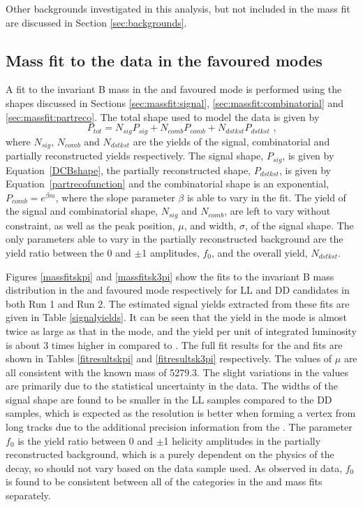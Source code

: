 Other backgrounds investigated in this analysis, but not included in the mass fit are discussed in Section \ref{sec:backgrounds}.


\subsection{Mass fit to the data in the favoured modes}
\label{sec:massfit:fit}

A fit to the invariant B mass in the \kpi and \kpipipi favoured mode is performed using the shapes discussed in Sections \ref{sec:massfit:signal}, \ref{sec:massfit:combinatorial} and \ref{sec:massfit:partreco}. The total shape used to model the data is given by
\begin{equation}
P_{tot} = N_{sig}P_{sig} + N_{comb}P_{comb} + N_{dstkst}P_{dstkst} \text{ ,}
\label{totalpdf}
\end{equation}
where $N_{sig}$, $N_{comb}$ and $N_{dstkst}$ are the yields of the signal, combinatorial and partially reconstructed yields respectively. The signal shape, $P_{sig}$, is given by Equation~\ref{DCBshape}, the partially reconstructed shape, $P_{dstkst}$, is given by Equation~\ref{partrecofunction} and the combinatorial shape is an exponential, $P_{comb} = e^{\beta m}$, where the slope parameter $\beta$ is able to vary in the fit. The yield of the signal and combinatorial shape, $N_{sig}$ and $N_{comb}$, are left to vary without constraint, as well as the peak position, $\mu$, and width, $\sigma$, of the signal shape. The only parameters able to vary in the partially reconstructed background are the yield ratio between the 0 and $\pm$1 amplitudes, $f_0$, and the overall yield, $N_{dstkst}$.

Figures \ref{massfitskpi} and \ref{massfitsk3pi} show the fits to the invariant B mass distribution in the \kpi and \kpipipi favoured mode respectively for LL and DD candidates in both Run 1 and Run 2. The estimated signal yields extracted from these fits are given in Table \ref{signalyields}. It can be seen that the yield in the \kpi mode is almost twice as large as that in the \kpipipi mode, and the yield per unit of integrated luminosity is about 3 times higher in \runone compared to \runtwo. The full fit results for the \kpi and \kpipipi fits are shown in Tables \ref{fitresultskpi} and \ref{fitresultsk3pi} respectively. The values of $\mu$ are all consistent with the known \Bm mass of 5279.3\mevcc. The slight variations in the values are primarily due to the statistical uncertainty in the data. The widths of the signal shape are found to be smaller in the LL samples compared to the DD samples, which is expected as the resolution is better when forming a vertex from long tracks due to the additional precision information from the \velo. The parameter $f_0$ is the yield ratio between 0 and $\pm$1 helicity amplitudes in the partially reconstructed background, which is a purely dependent on the physics of the decay, so should not vary based on the data sample used. As observed in data, $f_0$ is found to be consistent between all of the categories in the \kpi and \kpipipi mass fits separately.

